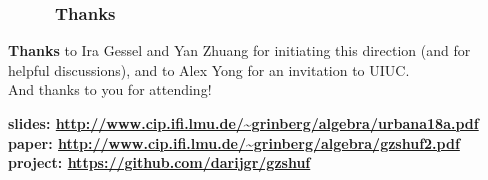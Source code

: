 \documentclass{beamer}
\newcommand{\red}{\color{red}}
\newcommand{\fti}[1]{\frametitle{\ \ \ \ \ #1}}
\theoremstyle{plain}
\begin{document}

      

      

      

      

      




\begin{frame}
\fti{Thanks}

\textbf{Thanks} to Ira Gessel and Yan Zhuang for initiating this direction
(and for helpful discussions), and to
Alex Yong for an invitation to UIUC. \\
And thanks to you for attending!

\vspace{3cm}

\textbf{slides: \red \url{http://www.cip.ifi.lmu.de/~grinberg/algebra/urbana18a.pdf}} \\
\textbf{paper: \red \url{http://www.cip.ifi.lmu.de/~grinberg/algebra/gzshuf2.pdf}} \\
\textbf{project: \red \url{https://github.com/darijgr/gzshuf}}

\end{frame}
\end{document}
